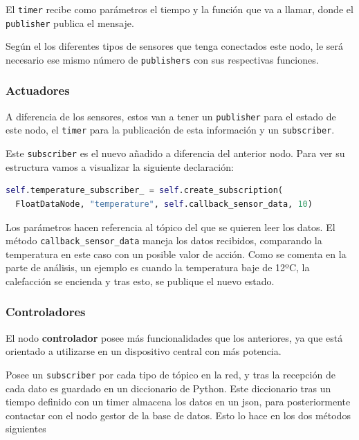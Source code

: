 El \verb|timer| recibe como parámetros el tiempo y la función que va a llamar, donde el \verb|publisher| publica el mensaje.

Según el los diferentes tipos de sensores que tenga conectados este nodo, le será necesario ese mismo número de \verb|publishers| con sus respectivas funciones.

\subsubsection{Actuadores}

A diferencia de los sensores, estos van a tener un \verb|publisher| para el estado de este nodo, el \verb|timer| para la publicación de esta información y un \verb|subscriber|.

Este \verb|subscriber| es el nuevo añadido a diferencia del anterior nodo. Para ver su estructura vamos a visualizar la siguiente declaración:

\begin{lstlisting}[language=Python, caption=Subscriber del actuador]
self.temperature_subscriber_ = self.create_subscription(
  FloatDataNode, "temperature", self.callback_sensor_data, 10)
\end{lstlisting}

Los parámetros hacen referencia al tópico del que se quieren leer los datos. El método \verb|callback_sensor_data| maneja los datos recibidos, comparando la temperatura en este caso con un posible valor de acción. Como se comenta en la parte de análisis, un ejemplo es cuando la temperatura baje de 12ºC, la calefacción se encienda y tras esto, se publique el nuevo estado.

\subsubsection{Controladores}

El nodo \textbf{controlador} posee más funcionalidades que los anteriores, ya que está orientado a utilizarse en un dispositivo central con más potencia.

Posee un \verb|subscriber| por cada tipo de tópico en la red, y tras la recepción de cada dato es guardado en un diccionario de Python. Este diccionario tras un tiempo definido con un timer almacena los datos en un json, para posteriormente contactar con el nodo gestor de la base de datos. Esto lo hace en los dos métodos siguientes

